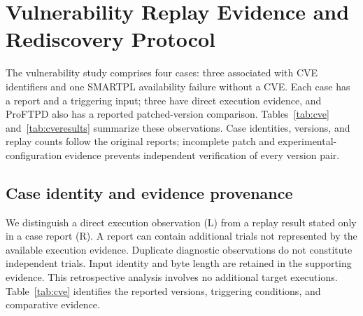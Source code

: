 \section{Vulnerability Replay Evidence and Rediscovery Protocol}
\label{sec:cve}
The vulnerability study comprises four cases: three associated with CVE identifiers and one SMARTPL availability failure without a CVE. Each case has a report and a triggering input; three have direct execution evidence, and ProFTPD also has a reported patched-version comparison. Tables~\ref{tab:cve} and~\ref{tab:cveresults} summarize these observations. Case identities, versions, and replay counts follow the original reports; incomplete patch and experimental-configuration evidence prevents independent verification of every version pair.

\subsection{Case identity and evidence provenance}
We distinguish a direct execution observation (L) from a replay result stated only in a case report (R). A report can contain additional trials not represented by the available execution evidence. Duplicate diagnostic observations do not constitute independent trials. Input identity and byte length are retained in the supporting evidence. This retrospective analysis involves no additional target executions. Table~\ref{tab:cve} identifies the reported versions, triggering conditions, and comparative evidence.

